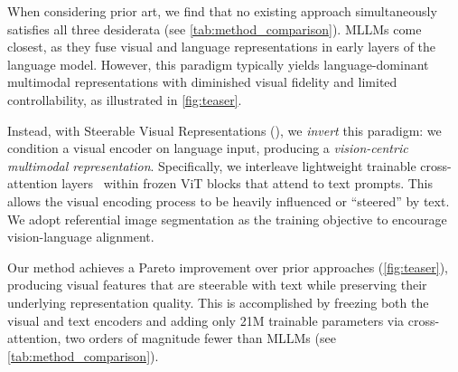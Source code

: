 When considering prior art, we find that no existing approach simultaneously satisfies all three desiderata (see \cref{tab:method_comparison}). MLLMs come closest, as they fuse visual and language representations in early layers of the language model.
However, this paradigm typically yields language-dominant multimodal representations with diminished visual fidelity and limited controllability, as illustrated in \cref{fig:teaser}.

Instead, with Steerable Visual Representations (\model{}), we \textit{invert} this paradigm:
we condition a visual encoder on language input, producing a \textit{vision-centric multimodal representation}.
Specifically, we interleave lightweight trainable cross-attention layers~\cite{alayrac2022flamingo} within frozen ViT blocks that attend to text prompts. 
This allows the visual encoding process to be heavily influenced or ``steered'' by text.
We adopt referential image segmentation as the training objective to encourage vision-language alignment.


Our method achieves a Pareto improvement over prior approaches (\cref{fig:teaser}),
producing visual features that are steerable with text while preserving their
underlying representation quality.
This is accomplished by freezing both the visual and text encoders and adding
only 21M trainable parameters via cross-attention, two orders of magnitude
fewer than MLLMs (see \cref{tab:method_comparison}).

